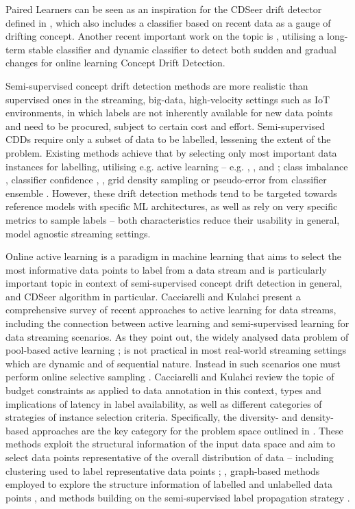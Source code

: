 \documentclass{svproc}
\begin{document}
Paired Learners can be seen as an inspiration for the CDSeer drift detector defined in \cite{pham2025}, which also includes a classifier based on recent data as a gauge of drifting concept. Another recent important work on the topic is \cite{zhang2018}, utilising a long-term stable classifier and dynamic classifier to detect both sudden and gradual changes for online learning Concept Drift Detection.

Semi-supervised concept drift detection methods are more realistic than supervised ones in the streaming, big-data, high-velocity settings such as IoT environments, in which labels are not inherently available for new data points and need to be procured, subject to certain cost and effort. Semi-supervised CDDs require only a subset of data to be labelled, lessening the extent of the problem. Existing methods achieve that by selecting only most important data instances for labelling, utilising e.g. active learning – e.g. \cite{fan2004}, \cite{zhu2007}, and \cite{masud2010}; class imbalance \cite{lughofer2016}, classifier confidence \cite{haque2015}, \cite{haque2016}, grid density sampling \cite{sethi2016} or pseudo-error from classifier ensemble \cite{pinage2020}. However, these drift detection methods tend to be targeted towards reference models with specific ML architectures, as well as rely on very specific metrics to sample labels – both characteristics reduce their usability in general, model agnostic streaming settings.

Online active learning is a paradigm in machine learning that aims to select the most informative data points to label from a data stream and is particularly important topic in context of semi-supervised concept drift detection in general, and CDSeer algorithm \cite{pham2025} in particular. Cacciarelli and Kulahci \cite{cacciarelli2024} present a comprehensive survey of recent approaches to active learning for data streams, including the connection between active learning and semi-supervised learning for data streaming scenarios. As they point out, the widely analysed data problem of pool-based active learning \cite{aggarwal2014}; \cite{kumar2020} is not practical in most real-world streaming settings which are dynamic and of sequential nature. Instead in such scenarios one must perform online selective sampling \cite{hanneke2021}. Cacciarelli and Kulahci review the topic of budget constraints as applied to data annotation in this context, types and implications of latency in label availability, as well as different categories of strategies of instance selection criteria. Specifically, the diversity- and density-based approaches are the key category for the problem space outlined in \cite{pham2025}. These methods exploit the structural information of the input data space and aim to select data points representative of the overall distribution of data – including clustering used to label representative data points \cite{min2020}; \cite{ienco2014}, graph-based methods employed to explore the structure information of labelled and unlabelled data points \cite{zhang2020}, and methods building on the semi-supervised label propagation strategy \cite{long2008}.
\end{document}
